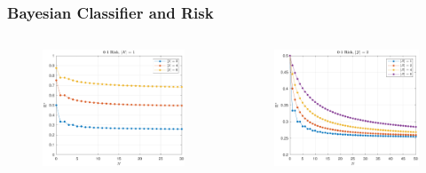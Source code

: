 \documentclass{beamer}
\begin{document}
\begin{frame}
\frametitle{Bayesian Classifier and Risk}

\begin{columns}[c]

\begin{column}{.5\linewidth}

\begin{figure}
\centering
\includegraphics[width=1\linewidth]{Risk_01_uni_N_leg_My.pdf}
\label{fig:Risk_01_uni_N_leg_My}
\end{figure}

\end{column}

\begin{column}{.5\linewidth}

\begin{figure}
\centering
\includegraphics[width=1\linewidth]{Risk_01_uni_N_leg_Mx.pdf}
\label{fig:Risk_01_uni_N_leg_Mx}
\end{figure}


\end{column}
\end{columns}
\end{frame}
\end{document}
